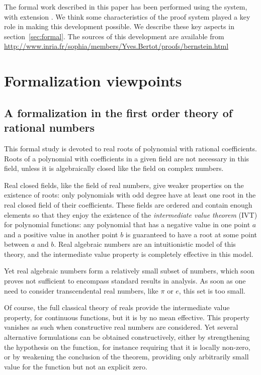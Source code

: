\documentclass{mscs}
\begin{document}
The formal work described in this paper has been performed using
the \Coq{} system\cite{coqart}, with \ssr{} extension
\cite{GONTHIER:2008:INRIA-00258384:4}.  We think some characteristics
of the proof system played a key role in making this development
possible.  We describe these key aspects in section~\ref{sec:formal}.
The sources of this development are available from\\
{\url{http://www.inria.fr/sophia/members/Yves.Bertot/proofs/bernstein.html}}

\section{Formalization viewpoints}
\label{sec:rational}

\subsection{A formalization in the first order theory of rational
  numbers}

This formal study is devoted to real roots of polynomial with rational
coefficients. Roots of a polynomial with coefficients in a given field
are not necessary in this field, unless it is algebraically closed
like the field on complex numbers.

Real closed fields, like the field of real numbers, give weaker
properties on the existence of roots: only polynomials with odd degree
have at least one root in the real closed field of their coefficients.
These fields are ordered and contain enough elements
so that they enjoy the existence of the {\em intermediate value
  theorem} (IVT) for polynomial functions:
any polynomial that has a negative value in one point \(a\) and a
positive value in another point \(b\) is guaranteed to have a root at
some point between \(a\) and \(b\). Real algebraic numbers are an
intuitionistic model of this theory, and the intermediate value
property is completely effective in this model.

Yet real algebraic numbers form a relatively small subset of numbers,
which soon proves not sufficient to encompass standard results in
analysis. As soon as one need to consider transcendental real numbers,
like $\pi$ or $e$, this set is too small.

Of course, the full classical theory of reals provide the intermediate
value property, for continuous functions, but it is by no mean
effective. This property vanishes as such when constructive real
numbers are considered. Yet several alternative formulations can be
obtained constructively, either by strengthening the hypothesis on the
function, for instance requiring that it is locally non-zero, or by
weakening the conclusion of the theorem, providing only arbitrarily
small value for the function but not an explicit zero.
\end{document}
